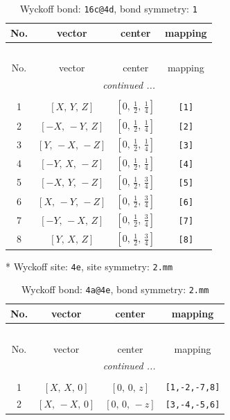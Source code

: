 \documentclass[fleqn,8pt]{jsarticle}
\begin{document}
\begin{longtable}{cccc}
\caption{Wyckoff bond: {\tt 16c@4d}, bond symmetry: {\tt 1}}
 \\
 \hline \hline
No. & vector & center & mapping \\ \hline \endfirsthead

\multicolumn{3}{l}{\tablename\ \thetable{}} \\
 \hline \hline
No. & vector & center & mapping \\ \hline \endhead

 \hline \hline
\multicolumn{3}{r}{\footnotesize\it continued ...} \\ \endfoot

 \hline \hline
\multicolumn{3}{r}{} \\ \endlastfoot

1 & $\left[ X,\, Y,\, Z \right]$ & $\left[ 0,\, \frac{1}{2},\, \frac{1}{4} \right]$ & {\tt [1]} \\ \hline
2 & $\left[ - X,\, - Y,\, Z \right]$ & $\left[ 0,\, \frac{1}{2},\, \frac{1}{4} \right]$ & {\tt [2]} \\ \hline
3 & $\left[ Y,\, - X,\, - Z \right]$ & $\left[ 0,\, \frac{1}{2},\, \frac{1}{4} \right]$ & {\tt [3]} \\ \hline
4 & $\left[ - Y,\, X,\, - Z \right]$ & $\left[ 0,\, \frac{1}{2},\, \frac{1}{4} \right]$ & {\tt [4]} \\ \hline
5 & $\left[ - X,\, Y,\, - Z \right]$ & $\left[ 0,\, \frac{1}{2},\, \frac{3}{4} \right]$ & {\tt [5]} \\ \hline
6 & $\left[ X,\, - Y,\, - Z \right]$ & $\left[ 0,\, \frac{1}{2},\, \frac{3}{4} \right]$ & {\tt [6]} \\ \hline
7 & $\left[ - Y,\, - X,\, Z \right]$ & $\left[ 0,\, \frac{1}{2},\, \frac{3}{4} \right]$ & {\tt [7]} \\ \hline
8 & $\left[ Y,\, X,\, Z \right]$ & $\left[ 0,\, \frac{1}{2},\, \frac{3}{4} \right]$ & {\tt [8]} \\
\end{longtable}
* Wyckoff site: {\tt 4e}, site symmetry: {\tt 2.mm}
\renewcommand{\arraystretch}{1.2}
\begin{longtable}{cccc}
\caption{Wyckoff bond: {\tt 4a@4e}, bond symmetry: {\tt 2.mm}}
 \\
 \hline \hline
No. & vector & center & mapping \\ \hline \endfirsthead

\multicolumn{3}{l}{\tablename\ \thetable{}} \\
 \hline \hline
No. & vector & center & mapping \\ \hline \endhead

 \hline \hline
\multicolumn{3}{r}{\footnotesize\it continued ...} \\ \endfoot

 \hline \hline
\multicolumn{3}{r}{} \\ \endlastfoot

1 & $\left[ X,\, X,\, 0 \right]$ & $\left[ 0,\, 0,\, z \right]$ & {\tt [1,-2,-7,8]} \\ \hline
2 & $\left[ X,\, - X,\, 0 \right]$ & $\left[ 0,\, 0,\, - z \right]$ & {\tt [3,-4,-5,6]} \\
\end{longtable}
\end{document}
